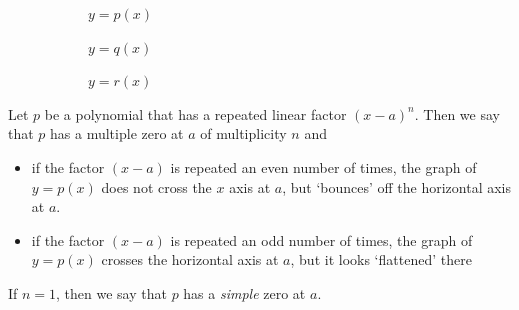 	 \setlength{\figurewidth}{0.25\textwidth}
	 \begin{figure}[!htb]
		 \begin{subfigure}{\figurewidth}
			 \caption{$y=p(x)$}
			 \label{poly:fig:bouncep}
		 \end{subfigure}
		 \hfill
		 \begin{subfigure}{\figurewidth}
			 \caption{$y=q(x)$}
			 \label{poly:fig:bounceq}
		 \end{subfigure}
		 \hfill
		 \begin{subfigure}{\figurewidth}
			 \caption{$y=r(x)$}
			 \label{poly:fig:bouncer}
		 \end{subfigure}
		 \caption{}
		 \label{poly:fig:moremultiple}
	 \end{figure}

	 \begin{pccdefinition}\label{poly:def:multzero}
		 Let $p$ be a polynomial that has a repeated linear factor $(x-a)^n$. Then we say
		 that $p$ has a multiple zero at $a$ of multiplicity $n$ and
		 \begin{itemize}
			 \item if the factor $(x-a)$ is repeated an even number of times, the graph of $y=p(x)$ does not
			       cross the $x$ axis at $a$, but `bounces' off the horizontal axis at $a$.
			 \item if the factor $(x-a)$ is repeated an odd number of times, the graph of $y=p(x)$ crosses the
			       horizontal axis at $a$, but it looks `flattened' there
		 \end{itemize}
		 If $n=1$, then we say that $p$ has a \emph{simple} zero at $a$.
	 \end{pccdefinition}

